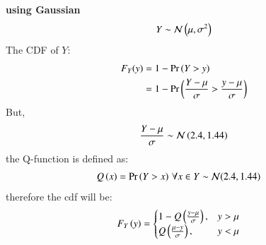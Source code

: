 \documentclass[journal,12pt,twocolumn]{IEEEtran}
\theoremstyle{remark}
\begin{document}
\textbf{using Gaussian}
\begin{align}
Y \sim \mathcal{N}\left(\mu,\sigma^2\right)
\end{align}
The CDF of $Y$:
\begin{align}
	F_Y(y) &= 1 - \Pr\left(Y>y\right)\\
	&= 1 - \Pr\left(\frac{Y-\mu}{\sigma}>\frac{y-\mu}{\sigma}\right)
\end{align}
But,
\begin{align}
	\frac{Y-\mu}{\sigma} &\sim \mathcal{N}\left(2.4,1.44\right)\\
\end{align}
the Q-function is defined as:
\begin{align}
Q\left(x\right) &= \Pr\left(Y > x\right) \, \forall x \in Y \sim \mathcal{N}(2.4,1.44) 
\end{align}
therefore the cdf will be:
\begin{align}
F_Y\left(y\right) &= 
\begin{cases}
           1-Q\left( \frac{y-\mu}{\sigma}\right), &  y > \mu \\
           Q\left( \frac{\mu-y}{\sigma}\right) , &  y < \mu
\end{cases} 
\end{align}
\end{document}
